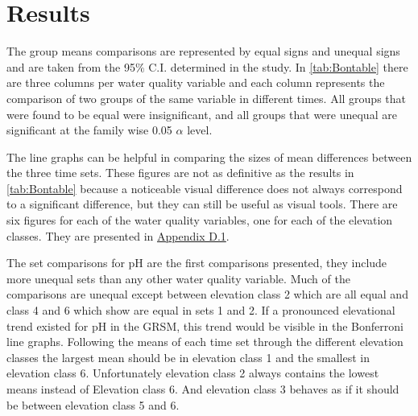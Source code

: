 \section{Results}%


The group means comparisons are represented by equal signs and unequal signs and are taken from the 95$\%$ C.I. determined in the study.
In \autoref{tab:Bontable} there are three columns per water quality variable and each column represents the comparison of two groups of the same variable in different times.
All groups that were found to be equal were insignificant, and all groups that were unequal are significant at the family wise 0.05 $\alpha$ level.

The line graphs can be helpful in comparing the sizes of mean differences between the three time sets.
These figures are not as definitive as the results in \autoref{tab:Bontable} because a noticeable visual difference does not always correspond to a significant difference, but they can still be useful as visual tools.
There are six figures for each of the water quality variables, one for each of the elevation classes.
They are presented in \hyperref[app:bon]{Appendix D.1}.


The set comparisons for pH are the first comparisons presented, they include more unequal sets than any other water quality variable.
Much of the comparisons are unequal except between elevation class 2 which are all equal and class 4 and 6 which show are equal in sets 1 and 2.
If a pronounced elevational trend existed for pH in the GRSM, this trend would be visible in the Bonferroni line graphs.
Following the means of each time set through the different elevation classes the largest mean should be in elevation class 1 and the smallest in elevation class 6.
Unfortunately elevation class 2 always contains the lowest means instead of Elevation class 6.
And elevation class 3 behaves as if it should be between elevation class 5 and 6.

